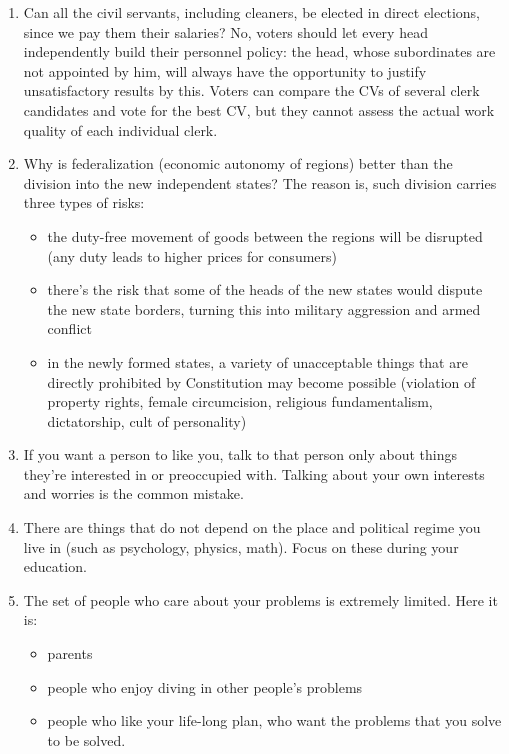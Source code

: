 \documentclass[11pt]{article}
\theoremstyle{remark}
\theoremstyle{definition}
\begin{document}
\begin{enumerate}
\item Can all the civil servants, including cleaners, be elected in direct elections, since we pay them their salaries? No, voters should let every head independently build their personnel policy: the head, whose subordinates are not appointed by him, will always have the opportunity to justify unsatisfactory results by this. Voters can compare the CVs of several clerk candidates and vote for the best CV, but they cannot assess the actual work quality of each individual clerk. 

\item Why is federalization (economic autonomy of regions) better than the division into the new independent states? The reason is, such division carries three types of risks:

\begin{itemize}

\item the duty-free movement of goods between the regions will be disrupted (any duty leads to higher prices for consumers)

\item there's the risk that some of the heads of the new states would dispute the new state borders, turning this into military aggression and armed conflict

\item in the newly formed states, a variety of unacceptable things that are directly prohibited by Constitution may become possible (violation of property rights, female circumcision, religious fundamentalism, dictatorship, cult of personality)

\end{itemize}


\item If you want a person to like you, talk to that person only about things they're interested in or preoccupied with. Talking about your own interests and worries is the common mistake.

\item There are things that do not depend on the place and political regime you live in (such as psychology, physics, math). Focus on these during your education.

\item The set of people who care about your problems is extremely limited. Here it is:
\begin{itemize}
\item parents
\item people who enjoy diving in other people's problems
\item people who like your life-long plan, who want the problems that you solve to be solved.
\end{itemize}


\end{enumerate}
\end{document}
